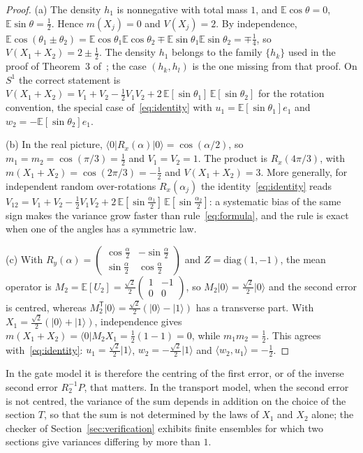 \documentclass[11pt,a4paper]{article}
\theoremstyle{definition}
\theoremstyle{plain}
\newcommand{\ket}[1]{\lvert#1\rangle}
\newcommand{\bra}[1]{\langle#1\rvert}
\newcommand{\E}{\mathbb{E}}
\newcommand{\T}{\mathsf{T}}
\newcommand{\ip}[2]{\langle#1,#2\rangle}
\begin{document}
\begin{proof}
(a) The density $h_1$ is nonnegative with total mass $1$, and
$\E\cos\theta=0$, $\E\sin\theta=\tfrac12$. Hence $m(X_j)=0$ and $V(X_j)=2$.
By independence,
$\E\cos(\theta_1\pm\theta_2)=\E\cos\theta_1\E\cos\theta_2\mp
\E\sin\theta_1\E\sin\theta_2=\mp\tfrac14$, so $V(X_1+X_2)=2\pm\tfrac12$.
The density $h_1$ belongs to the family $\{h_k\}$ used in the proof of
Theorem~3 of~\cite{LacallePozo2019}; the case $(h_k,h_l)$ is the one missing
from that proof. On $S^1$ the correct statement is
$V(X_1+X_2)=V_1+V_2-\tfrac12V_1V_2+2\,\E[\sin\theta_1]\,\E[\sin\theta_2]$ for
the rotation convention, the special case of~\eqref{eq:identity} with
$u_1=\E[\sin\theta_1]e_1$ and $w_2=-\E[\sin\theta_2]e_1$.

(b) In the real picture, $\bra0R_x(\alpha)\ket0=\cos(\alpha/2)$, so
$m_1=m_2=\cos(\pi/3)=\tfrac12$ and $V_1=V_2=1$. The product is
$R_x(4\pi/3)$, with $m(X_1+X_2)=\cos(2\pi/3)=-\tfrac12$ and
$V(X_1+X_2)=3$. More generally, for independent random over-rotations
$R_x(\alpha_j)$ the identity~\eqref{eq:identity} reads
$V_{12}=V_1+V_2-\tfrac12V_1V_2+2\,\E[\sin\tfrac{\alpha_1}2]\,
\E[\sin\tfrac{\alpha_2}2]$: a systematic bias of the same sign makes the
variance grow faster than rule~\eqref{eq:formula}, and the rule is exact when
one of the angles has a symmetric law.

(c) With $R_y(\alpha)=\begin{pmatrix}\cos\frac\alpha2&-\sin\frac\alpha2\\
\sin\frac\alpha2&\cos\frac\alpha2\end{pmatrix}$ and $Z=\mathrm{diag}(1,-1)$,
the mean operator is
$M_2=\E[U_2]=\tfrac{\sqrt2}{2}\begin{pmatrix}1&-1\\0&0\end{pmatrix}$, so
$M_2\ket0=\tfrac{\sqrt2}2\ket0$ and the second error is centred, whereas
$M_2^\T\ket0=\tfrac{\sqrt2}2(\ket0-\ket1)$ has a transverse part. With
$X_1=\tfrac{\sqrt2}2(\ket0+\ket1)$, independence gives
$m(X_1+X_2)=\bra0M_2X_1=\tfrac12(1-1)=0$, while
$m_1m_2=\tfrac12$. This agrees with~\eqref{eq:identity}:
$u_1=\tfrac{\sqrt2}2\ket1$, $w_2=-\tfrac{\sqrt2}2\ket1$ and
$\ip{w_2}{u_1}=-\tfrac12$.
\end{proof}

In the gate model it is therefore the centring of the first error, or of the
inverse second error $R_2^{-1}P$, that matters. In the transport model, when
the second error is not centred, the variance of the sum depends in addition
on the choice of the section $T$, so that the sum is not determined by the
laws of $X_1$ and $X_2$ alone; the checker of Section~\ref{sec:verification}
exhibits finite ensembles for which two sections give variances differing by
more than $1$.
\end{document}
